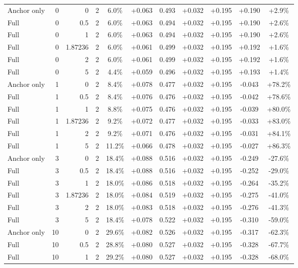 \begin{table}[htbp]
\begin{tabular}{lrrrccccccc}
Anchor only & 0 & 0 & 2 & 6.0\% & +0.063 & 0.493 & +0.032 & +0.195 & +0.190 & +2.9\% \\
Full & 0 & 0.5 & 2 & 6.0\% & +0.063 & 0.494 & +0.032 & +0.195 & +0.190 & +2.6\% \\
Full & 0 & 1 & 2 & 6.0\% & +0.063 & 0.494 & +0.032 & +0.195 & +0.190 & +2.6\% \\
Full & 0 & 1.87236 & 2 & 6.0\% & +0.061 & 0.499 & +0.032 & +0.195 & +0.192 & +1.6\% \\
Full & 0 & 2 & 2 & 6.0\% & +0.061 & 0.499 & +0.032 & +0.195 & +0.192 & +1.6\% \\
Full & 0 & 5 & 2 & 4.4\% & +0.059 & 0.496 & +0.032 & +0.195 & +0.193 & +1.4\% \\
Anchor only & 1 & 0 & 2 & 8.4\% & +0.078 & 0.477 & +0.032 & +0.195 & -0.043 & +78.2\% \\
Full & 1 & 0.5 & 2 & 8.4\% & +0.076 & 0.476 & +0.032 & +0.195 & -0.042 & +78.6\% \\
Full & 1 & 1 & 2 & 8.8\% & +0.075 & 0.476 & +0.032 & +0.195 & -0.039 & +80.0\% \\
Full & 1 & 1.87236 & 2 & 9.2\% & +0.072 & 0.477 & +0.032 & +0.195 & -0.033 & +83.0\% \\
Full & 1 & 2 & 2 & 9.2\% & +0.071 & 0.476 & +0.032 & +0.195 & -0.031 & +84.1\% \\
Full & 1 & 5 & 2 & 11.2\% & +0.066 & 0.478 & +0.032 & +0.195 & -0.027 & +86.3\% \\
Anchor only & 3 & 0 & 2 & 18.4\% & +0.088 & 0.516 & +0.032 & +0.195 & -0.249 & -27.6\% \\
Full & 3 & 0.5 & 2 & 18.4\% & +0.088 & 0.516 & +0.032 & +0.195 & -0.252 & -29.0\% \\
Full & 3 & 1 & 2 & 18.0\% & +0.086 & 0.518 & +0.032 & +0.195 & -0.264 & -35.2\% \\
Full & 3 & 1.87236 & 2 & 18.0\% & +0.084 & 0.519 & +0.032 & +0.195 & -0.275 & -41.0\% \\
Full & 3 & 2 & 2 & 18.0\% & +0.083 & 0.518 & +0.032 & +0.195 & -0.276 & -41.3\% \\
Full & 3 & 5 & 2 & 18.4\% & +0.078 & 0.522 & +0.032 & +0.195 & -0.310 & -59.0\% \\
Anchor only & 10 & 0 & 2 & 29.6\% & +0.082 & 0.526 & +0.032 & +0.195 & -0.317 & -62.3\% \\
Full & 10 & 0.5 & 2 & 28.8\% & +0.080 & 0.527 & +0.032 & +0.195 & -0.328 & -67.7\% \\
Full & 10 & 1 & 2 & 29.2\% & +0.080 & 0.527 & +0.032 & +0.195 & -0.328 & -68.0\% \\

\end{tabular}
\end{table}
